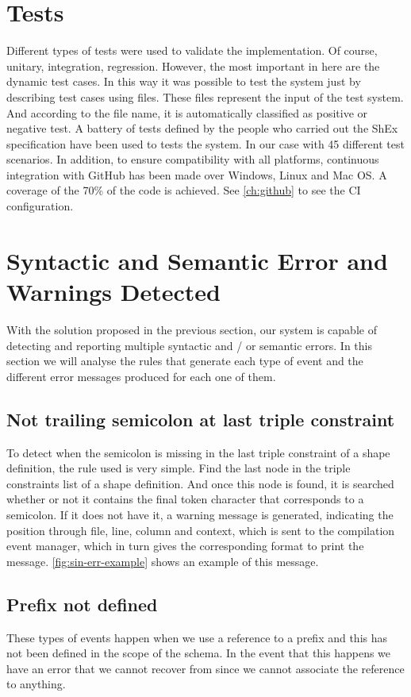 \section{Tests}
Different types of tests were used to validate the implementation. Of course, unitary, integration, regression.
However, the most important in here are the dynamic test cases. In this way it was possible to test the
system just by describing test cases using files. These files represent the input of the test system. And according
to the file name, it is automatically classified as positive or negative test. A battery of tests defined by the
people who carried out the ShEx specification have been used to tests the system. In our case with 45 different test
scenarios. In addition, to ensure compatibility with all platforms, continuous integration with GitHub has been made
over Windows, Linux and Mac OS. A coverage of the 70\% of the code is achieved.
See \cref{ch:github} to see the CI configuration.

\section{Syntactic and Semantic Error and Warnings Detected}
With the solution proposed in the previous section, our system is capable of detecting and reporting multiple syntactic
and / or semantic errors. In this section we will analyse the rules that generate each type of event and the different
error messages produced for each one of them.

\subsection{Not trailing semicolon at last triple constraint}
To detect when the semicolon is missing in the last triple constraint of a shape definition, the rule used is very simple.
Find the last node in the triple constraints list of a shape definition. And once this node is found, it is searched whether or
not it contains the final token character that corresponds to a semicolon. If it does not have it, a warning message is generated,
indicating the position through file, line, column and context, which is sent to the compilation event manager, which in turn gives
the corresponding format to print the message. \cref{fig:sin-err-example} shows an example of this message.

\subsection{Prefix not defined}
These types of events happen when we use a reference to a prefix and this has not been defined in the scope of the schema.
In the event that this happens we have an error that we cannot recover from since we cannot associate the reference to anything.


